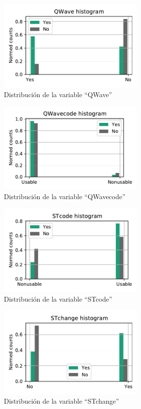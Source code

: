 \documentclass[11pt]{article}
\begin{document}
\begin{figure}[H]
    \centering
    \includegraphics[width = 0.65\textwidth]{2-QWave-dist.pdf}
    \caption{Distribución de la variable ``QWave''}
    \label{2-QWave-dist}
\end{figure}
\begin{figure}[H]
    \centering
    \includegraphics[width = 0.65\textwidth]{2-QWavecode-dist.pdf}
    \caption{Distribución de la variable ``QWavecode''}
    \label{2-QWavecode-dist}
\end{figure}
\begin{figure}[H]
    \centering
    \includegraphics[width = 0.65\textwidth]{2-STcode-dist.pdf}
    \caption{Distribución de la variable ``STcode''}
    \label{2-STcode-dist}
\end{figure}
\begin{figure}[H]
    \centering
    \includegraphics[width = 0.65\textwidth]{2-STchange-dist.pdf}
    \caption{Distribución de la variable ``STchange''}
    \label{2-STchange-dist}
\end{figure}
\end{document}
